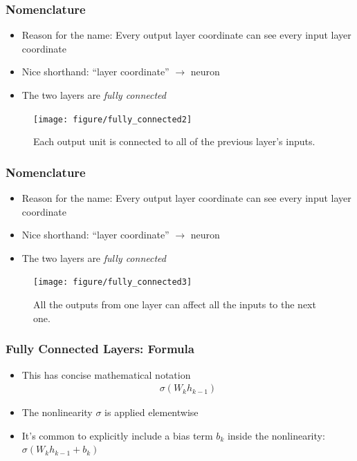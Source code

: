 \documentclass[10pt,mathserif]{beamer}
\begin{document}
\begin{frame}
  \frametitle{Nomenclature}
  \begin{itemize}
  \item Reason for the name: Every output layer coordinate can see every input
    layer coordinate
  \item Nice shorthand: ``layer coordinate'' $\rightarrow$ neuron
  \item The two layers are \textit{fully connected}
  \end{itemize}
\begin{figure}
  \centering
  \texttt{[image: figure/fully\_connected2]}
  \caption{Each output unit is connected to all of the previous layer's inputs.}
\end{figure}
\end{frame}

\begin{frame}
  \frametitle{Nomenclature}
  \begin{itemize}
  \item Reason for the name: Every output layer coordinate can see every input
    layer coordinate
  \item Nice shorthand: ``layer coordinate'' $\rightarrow$ neuron
  \item The two layers are \textit{fully connected}
  \end{itemize}
\begin{figure}
  \centering
  \texttt{[image: figure/fully\_connected3]}
  \caption{All the outputs from one layer can affect all the inputs to the next
    one. \label{fig:fully_connected3}}
\end{figure}
\end{frame}

\begin{frame}
  \frametitle{Fully Connected Layers: Formula}
  \begin{itemize}
  \item This has concise mathematical notation
    \begin{align*}
      \sigma\left(W_{k}h_{k - 1}\right)
    \end{align*}
  \item The nonlinearity $\sigma$ is applied elementwise
  \item It's common to explicitly include a bias term $b_{k}$ inside the
    nonlinearity: $\sigma\left(W_k h_{k - 1} + b_k\right)$
  \end{itemize}
\end{frame}
\end{document}
